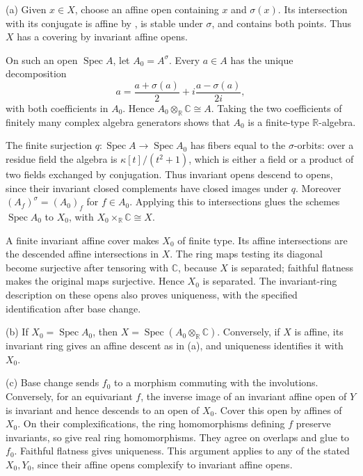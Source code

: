 (a) Given $x\in X$, choose an affine open containing $x$ and $\sigma(x)$. Its intersection with its conjugate is affine by , is stable under $\sigma$, and contains both points. Thus $X$ has a covering by invariant affine opens.

On such an open $\operatorname{Spec}A$, let $A_0=A^\sigma$. Every $a\in A$ has the unique decomposition
\[a=\frac{a+\sigma(a)}2+i\frac{a-\sigma(a)}{2i},\]
with both coefficients in $A_0$. Hence $A_0\otimes_{\mathbb R}\mathbb C\cong A$. Taking the two coefficients of finitely many complex algebra generators shows that $A_0$ is a finite-type $\mathbb R$-algebra.

The finite surjection $q:\operatorname{Spec}A\to\operatorname{Spec}A_0$ has fibers equal to the $\sigma$-orbits: over a residue field the algebra is $\kappa[t]/(t^2+1)$, which is either a field or a product of two fields exchanged by conjugation. Thus invariant opens descend to opens, since their invariant closed complements have closed images under $q$. Moreover $(A_f)^\sigma=(A_0)_f$ for $f\in A_0$. Applying this to intersections glues the schemes $\operatorname{Spec}A_0$ to $X_0$, with $X_0\times_{\mathbb R}\mathbb C\cong X$.

A finite invariant affine cover makes $X_0$ of finite type. Its affine intersections are the descended affine intersections in $X$. The ring maps testing its diagonal become surjective after tensoring with $\mathbb C$, because $X$ is separated; faithful flatness makes the original maps surjective. Hence $X_0$ is separated. The invariant-ring description on these opens also proves uniqueness, with the specified identification after base change.

(b) If $X_0=\operatorname{Spec}A_0$, then $X=\operatorname{Spec}(A_0\otimes_{\mathbb R}\mathbb C)$. Conversely, if $X$ is affine, its invariant ring gives an affine descent as in (a), and uniqueness identifies it with $X_0$.

(c) Base change sends $f_0$ to a morphism commuting with the involutions. Conversely, for an equivariant $f$, the inverse image of an invariant affine open of $Y$ is invariant and hence descends to an open of $X_0$. Cover this open by affines of $X_0$. On their complexifications, the ring homomorphisms defining $f$ preserve invariants, so give real ring homomorphisms. They agree on overlaps and glue to $f_0$. Faithful flatness gives uniqueness. This argument applies to any of the stated $X_0,Y_0$, since their affine opens complexify to invariant affine opens.

